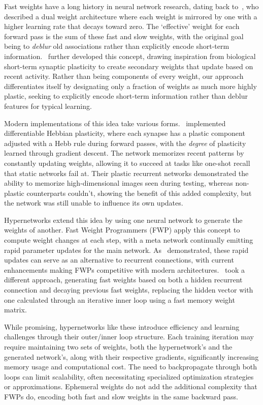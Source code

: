 Fast weights have a long history in neural network research, dating back to~\cite{hintonUsingFastWeights1987}, who described a dual weight architecture where each weight is mirrored by one with a higher learning rate that decays toward zero. The `effective' weight for each forward pass is the sum of these fast and slow weights, with the original goal being to \emph{deblur} old associations rather than explicitly encode short-term information.~\cite{schmidhuberLearningControlFastweight1992} further developed this concept, drawing inspiration from biological short-term synaptic plasticity to create secondary weights that update based on recent activity. Rather than being components of every weight, our approach differentiates itself by designating only a fraction of weights as much more highly plastic, seeking to explicitly encode short-term information rather than deblur features for typical learning.

Modern implementations of this idea take various forms.~\cite{miconiDifferentiablePlasticityTraining2018a} implemented differentiable Hebbian plasticity, where each synapse has a plastic component adjusted with a Hebb rule during forward passes, with the \emph{degree} of plasticity learned through gradient descent. The network memorizes recent patterns by constantly updating weights, allowing it to succeed at tasks like one-shot recall that static networks fail at. Their plastic recurrent networks demonstrated the ability to memorize high-dimensional images seen during testing, whereas non-plastic counterparts couldn't, showing the benefit of this added complexity, but the network was still unable to influence its own updates.

Hypernetworks extend this idea by using one neural network to generate the weights of another. Fast Weight Programmers (FWP) apply this concept to compute weight changes at each step, with a meta network continually emitting rapid parameter updates for the main network. As~\cite{irieGoingLinearTransformers2021a} demonstrated, these rapid updates can serve as an alternative to recurrent connections, with current enhancements making FWPs competitive with modern architectures.~\cite{baUsingFastWeights2016} took a different approach, generating fast weights based on both a hidden recurrent connection and decaying previous fast weights, replacing the hidden vector with one calculated through an iterative inner loop using a fast memory weight matrix.

While promising, hypernetworks like these introduce efficiency and learning challenges through their outer/inner loop structure. Each training iteration may require maintaining two sets of weights, both the hypernetwork's and the generated network's, along with their respective gradients, significantly increasing memory usage and computational cost. The need to backpropagate through both loops can limit scalability, often necessitating specialized optimization strategies or approximations. Ephemeral weights do not add the additional complexity that FWPs do, encoding both fast and slow weights in the same backward pass.

